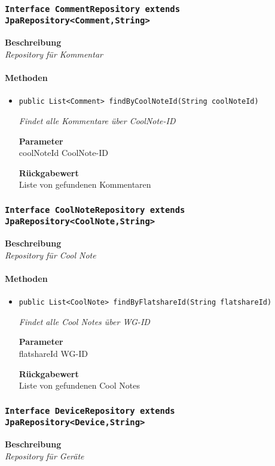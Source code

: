      \subsubsection{\texttt{Interface CommentRepository extends JpaRepository<Comment,String>}}
     \textbf{Beschreibung} \\
     \textit{Repository für Kommentar}
     \paragraph*{Methoden}
     \begin{itemize}
     	\item{\texttt{public List<Comment> findByCoolNoteId(String coolNoteId)}}
     	
     	\textit{Findet alle Kommentare über CoolNote-ID}
     	
     	\textbf{Parameter} \\
     	coolNoteId CoolNote-ID
     	
     	\textbf{Rückgabewert} \\
     	Liste von gefundenen Kommentaren
     \end{itemize}
     \subsubsection{\texttt{Interface CoolNoteRepository extends JpaRepository<CoolNote,String>}}
     \textbf{Beschreibung} \\
     \textit{Repository für Cool Note}
     \paragraph*{Methoden}
     \begin{itemize}
     	\item{\texttt{public List<CoolNote> findByFlatshareId(String flatshareId)}}
     	
     	\textit{Findet alle Cool Notes über WG-ID}
     	
     	\textbf{Parameter} \\
     	flatshareId WG-ID
     	
     	\textbf{Rückgabewert} \\
     	Liste von gefundenen Cool Notes
     \end{itemize}
     \subsubsection{\texttt{Interface DeviceRepository extends JpaRepository<Device,String>}}
     \textbf{Beschreibung} \\
     \textit{Repository für Geräte}
